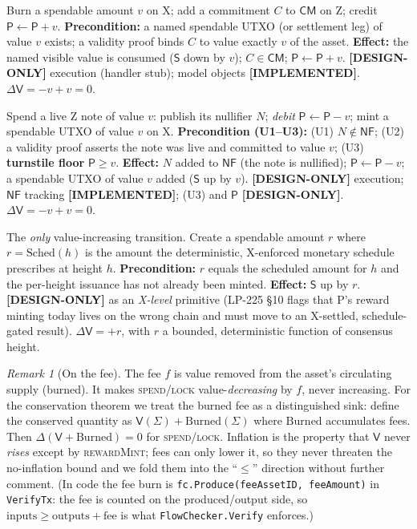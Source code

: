 \documentclass[11pt]{article}
\theoremstyle{definition}
\theoremstyle{remark}
\newtheorem{remark}{Remark}
\newcommand{\IMPL}{\textbf{[IMPLEMENTED]}}
\newcommand{\DESIGN}{\textbf{[DESIGN-ONLY]}}
\newcommand{\Val}{\mathsf{V}}
\newcommand{\spend}{\mathsf{S}}
\newcommand{\pool}{\mathsf{P}}
\newcommand{\NF}{\mathsf{NF}}
\newcommand{\CM}{\mathsf{CM}}
\begin{document}
\begin{description}[leftmargin=1.5em,style=nextline]
\item[\textsc{shield}] Burn a spendable amount $v$ on X; add a commitment
  $C$ to $\CM$ on Z; credit $\pool \gets \pool + v$. \textbf{Precondition:}
  a named spendable UTXO (or settlement leg) of value $v$ exists; a
  validity proof binds $C$ to value exactly $v$ of the asset.
  \textbf{Effect:} the named visible value is consumed
  ($\spend$ down by $v$); $C\in\CM$; $\pool\gets\pool+v$.
  \DESIGN{} execution (handler stub); model objects \IMPL{}.
  $\Delta\Val = -v + v = 0$.

\item[\textsc{unshield}] Spend a live Z note of value $v$: publish its
  nullifier $N$; \emph{debit} $\pool \gets \pool - v$; mint a spendable
  UTXO of value $v$ on X. \textbf{Precondition (U1--U3):} (U1) $N\notin\NF$;
  (U2) a validity proof asserts the note was live and committed to value
  $v$; (U3) \textbf{turnstile floor} $\pool \ge v$. \textbf{Effect:}
  $N$ added to $\NF$ (the note is nullified); $\pool\gets\pool-v$; a
  spendable UTXO of value $v$ added ($\spend$ up by $v$).
  \DESIGN{} execution; $\NF$ tracking \IMPL{}; (U3) and $\pool$ \DESIGN{}.
  $\Delta\Val = -v + v = 0$.

\item[\textsc{rewardMint}] The \emph{only} value-increasing transition.
  Create a spendable amount $r$ where $r = \mathrm{Sched}(h)$ is the
  amount the deterministic, X-enforced monetary schedule prescribes at
  height $h$. \textbf{Precondition:} $r$ equals the scheduled amount for
  $h$ and the per-height issuance has not already been minted.
  \textbf{Effect:} $\spend$ up by $r$. \DESIGN{} as an \emph{X-level}
  primitive (LP-225 \S10 flags that P's reward minting today lives on the
  wrong chain and must move to an X-settled, schedule-gated result).
  $\Delta\Val = +r$, with $r$ a bounded, deterministic function of
  consensus height.
\end{description}

\begin{remark}[On the fee]
\label{rem:fee}
The fee $f$ is value removed from the asset's circulating supply (burned).
It makes \textsc{spend}/\textsc{lock} value-\emph{decreasing} by $f$, never
increasing. For the conservation theorem we treat the burned fee as a
distinguished sink: define the conserved quantity as $\Val(\Sigma) +
\mathrm{Burned}(\Sigma)$ where $\mathrm{Burned}$ accumulates fees. Then
$\Delta(\Val+\mathrm{Burned}) = 0$ for \textsc{spend}/\textsc{lock}. Inflation
is the property that $\Val$ never \emph{rises} except by \textsc{rewardMint};
fees can only lower it, so they never threaten the no-inflation bound and we
fold them into the ``$\le$'' direction without further comment. (In code the
fee burn is \texttt{fc.Produce(feeAssetID, feeAmount)} in \texttt{VerifyTx}:
the fee is counted on the produced/output side, so $\mathrm{inputs}\ge
\mathrm{outputs}+\mathrm{fee}$ is what \texttt{FlowChecker.Verify} enforces.)
\end{remark}
\end{document}
